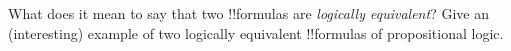 \documentclass[../../../include/open-logic-section]{subfiles}
\begin{document}
\begin{prob}
    \citep[1.1 item 5]{MacFarlane-2020-PhilosophicalLogicContemporary}
    What does it mean to say that two !!{formula}s are \emph{logically equivalent}?
    Give an (interesting) example of two logically equivalent !!{formula}s of
    propositional logic.    
\end{prob}

    
    
\end{document}
